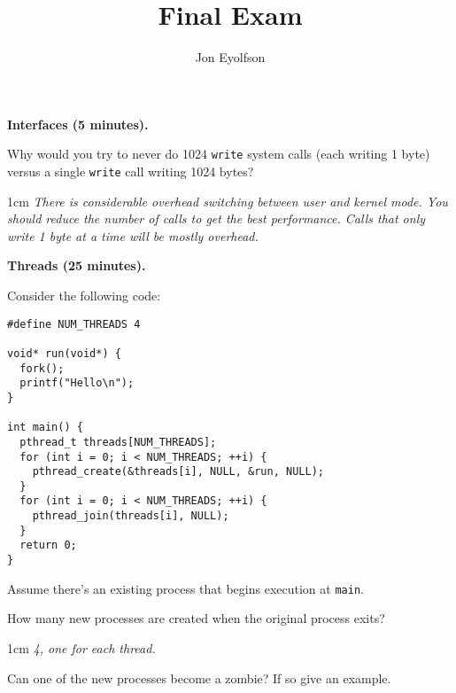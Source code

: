 \documentclass[12pt]{article}
\title{Final Exam}
\author{Jon Eyolfson}
\newenvironment{answer}{\begin{adjustwidth}{1cm}{}\itshape}{\end{adjustwidth}}
\begin{document}

\noindent {\Large \bfseries \color{uclablue} \thetitle}

\noindent {\normalsize \theauthor}

\vspace{1em}

\textbf{Interfaces (5 minutes).}

\vspace{1em}

Why would you try to never do 1024 \texttt{write} system calls (each writing 1
byte) versus a single \texttt{write} call writing 1024 bytes?

\begin{answer}
  There is considerable overhead switching between user and kernel mode.
  You should reduce the number of calls to get the best performance.
  Calls that only write 1 byte at a time will be mostly overhead.
\end{answer}

\newpage

\textbf{Threads (25 minutes).}

\vspace{1em}

Consider the following code:

\begin{lstlisting}
#define NUM_THREADS 4

void* run(void*) {
  fork();
  printf("Hello\n");
}

int main() {
  pthread_t threads[NUM_THREADS];
  for (int i = 0; i < NUM_THREADS; ++i) {
    pthread_create(&threads[i], NULL, &run, NULL);
  }
  for (int i = 0; i < NUM_THREADS; ++i) {
    pthread_join(threads[i], NULL);
  }
  return 0;
}
\end{lstlisting}

Assume there's an existing process that begins execution at \texttt{main}.

\vspace{1em}

How many new processes are created when the original process exits?

\begin{answer}
  4, one for each thread.
\end{answer}

\vspace{1em}

Can one of the new processes become a zombie? If so give an example.
\end{document}

